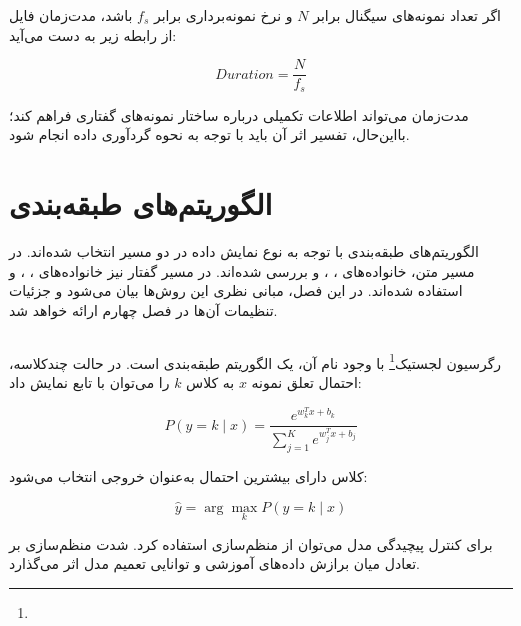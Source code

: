 اگر تعداد نمونه‌های سیگنال برابر $N$ و نرخ نمونه‌برداری برابر $f_s$ باشد، مدت‌زمان فایل از رابطه زیر به دست می‌آید:

\begin{equation}
Duration
=
\frac{N}{f_s}
\end{equation}

مدت‌زمان می‌تواند اطلاعات تکمیلی درباره ساختار نمونه‌های گفتاری فراهم کند؛ بااین‌حال، تفسیر اثر آن باید با توجه به نحوه گردآوری داده انجام شود.


\section{الگوریتم‌های طبقه‌بندی}

الگوریتم‌های طبقه‌بندی با توجه به نوع نمایش داده در دو مسیر انتخاب شده‌اند. در مسیر متن، خانواده‌های
،
،
و
بررسی شده‌اند. در مسیر گفتار نیز خانواده‌های
،
،
و
استفاده شده‌اند. در این فصل، مبانی نظری این روش‌ها بیان می‌شود و جزئیات تنظیمات آن‌ها در فصل چهارم ارائه خواهد شد.


\subsection{}

رگرسیون لجستیک\footnote{} با وجود نام آن، یک الگوریتم طبقه‌بندی است. در حالت چندکلاسه، احتمال تعلق نمونه $x$ به کلاس $k$ را می‌توان با تابع
نمایش داد:

\begin{equation}
P(y=k\mid x)
=
\frac{
e^{w_k^Tx+b_k}
}{
\sum_{j=1}^{K}e^{w_j^Tx+b_j}
}
\end{equation}

کلاس دارای بیشترین احتمال به‌عنوان خروجی انتخاب می‌شود:

\begin{equation}
\hat{y}
=
\arg\max_k P(y=k\mid x)
\end{equation}

برای کنترل پیچیدگی مدل می‌توان از منظم‌سازی استفاده کرد. شدت منظم‌سازی بر تعادل میان برازش داده‌های آموزشی و توانایی تعمیم مدل اثر می‌گذارد.


